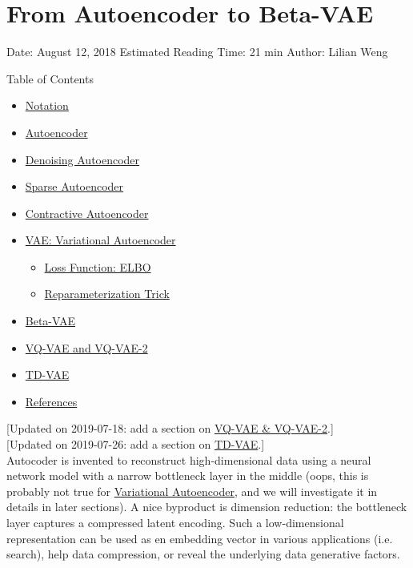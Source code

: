 \section{From Autoencoder to Beta-VAE}\label{from-autoencoder-to-beta-vae}

Date: August 12, 2018 \textbar{} Estimated Reading Time: 21 min \textbar{} Author: Lilian Weng

{Table of Contents}

\begin{itemize}
\tightlist
\item
  \hyperref[notation]{Notation}
\item
  \hyperref[autoencoder]{Autoencoder}
\item
  \hyperref[denoising-autoencoder]{Denoising Autoencoder}
\item
  \hyperref[sparse-autoencoder]{Sparse Autoencoder}
\item
  \hyperref[contractive-autoencoder]{Contractive Autoencoder}
\item
  \hyperref[vae-variational-autoencoder]{VAE: Variational Autoencoder}

  \begin{itemize}
  \tightlist
  \item
    \hyperref[loss-function-elbo]{Loss Function: ELBO}
  \item
    \hyperref[reparameterization-trick]{Reparameterization Trick}
  \end{itemize}
\item
  \hyperref[beta-vae]{Beta-VAE}
\item
  \hyperref[vq-vae-and-vq-vae-2]{VQ-VAE and VQ-VAE-2}
\item
  \hyperref[td-vae]{TD-VAE}
\item
  \hyperref[references]{References}
\end{itemize}

{{[}Updated on 2019-07-18: add a section on \hyperref[vq-vae-and-vq-vae-2]{VQ-VAE \& VQ-VAE-2}.{]}}\\
{{[}Updated on 2019-07-26: add a section on \hyperref[td-vae]{TD-VAE}.{]}}\\

Autocoder is invented to reconstruct high-dimensional data using a neural network model with a narrow bottleneck layer in the middle (oops, this is probably not true for \hyperref[vae-variational-autoencoder]{Variational Autoencoder}, and we will investigate it in details in later sections). A nice byproduct is dimension reduction: the bottleneck layer captures a compressed latent encoding. Such a low-dimensional representation can be used as en embedding vector in various applications (i.e. search), help data compression, or reveal the underlying data generative factors.

